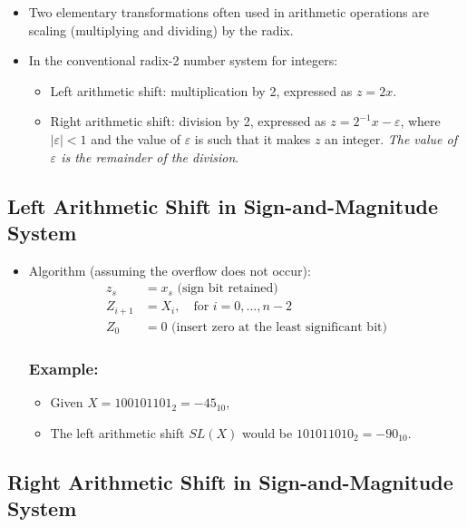 \documentclass[12pt,openany, tikz,border=10pt]{book}
\begin{document}
\begin{itemize}
    \item[] Two elementary transformations often used in arithmetic operations are scaling (multiplying and dividing) by the radix.
    \item[] In the conventional radix-2 number system for integers:
    \begin{itemize}
        \item[] Left arithmetic shift: multiplication by 2, expressed as \( z = 2x \).
        \item[] Right arithmetic shift: division by 2, expressed as \( z = 2^{-1}x - \varepsilon \), where \( |\varepsilon| < 1 \) and the value of \( \varepsilon \) is such that it makes \( z \) an integer. \textit{The value of \( \varepsilon \) is the remainder of the division}.
        
    \end{itemize}
\end{itemize}

\subsection{Left Arithmetic Shift in Sign-and-Magnitude System}

\begin{itemize}
    \item[] Algorithm (assuming the overflow does not occur):
    \begin{align*}
        z_s &= x_s \text{ (sign bit retained)} \\
        Z_{i+1} &= X_i, \quad \text{for } i = 0, \ldots, n-2 \\
        Z_0 &= 0 \text{ (insert zero at the least significant bit)}
    \end{align*}
    \subsubsection*{Example:}
    \begin{itemize}
        \item[] Given \( X = 100101101_2 = -45_{10} \),
        \item[] The left arithmetic shift \( SL(X) \) would be \( 101011010_2 = -90_{10} \).
    \end{itemize}
\end{itemize}

\subsection{Right Arithmetic Shift in Sign-and-Magnitude System}
\end{document}

